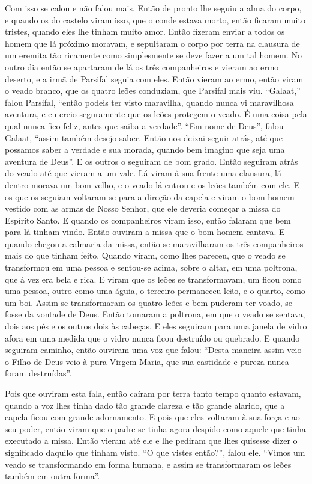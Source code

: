 Com isso se calou e não falou mais. Então de pronto lhe seguiu a alma do corpo,
e quando os do castelo viram isso, que o conde estava morto, então ficaram
muito tristes, quando eles lhe tinham muito amor. Então fizeram enviar a todos
os homem que lá próximo moravam, e sepultaram o corpo por terra na clausura de
um eremita tão ricamente como simplesmente se deve fazer a um tal homem. No
outro dia então se apartaram de lá os três companheiros e vieram ao ermo
deserto, e a irmã de Parsifal seguia com eles. Então vieram ao ermo, então
viram o veado branco, que os quatro leões conduziam, que Parsifal mais viu.
“Galaat,” falou Parsifal, “então podeis ter visto maravilha, quando nunca vi
maravilhosa aventura, e eu creio seguramente que os leões protegem o veado. É
uma coisa pela qual nunca fico feliz, antes que saiba a verdade”. “Em nome de
Deus”, falou Galaat, “assim também desejo saber. Então nos deixai seguir atrás,
até que possamos saber a verdade e sua morada, quando bem imagino que seja uma
aventura de Deus”. E os outros o seguiram de bom grado. Então seguiram atrás do
veado até que vieram a um vale. Lá viram à sua frente uma clausura, lá dentro
morava um bom velho, e o veado lá entrou e os leões também com ele. E os que os
seguiam voltaram-se para a direção da capela e viram o bom homem vestido com as
armas de Nosso Senhor, que ele deveria começar a missa do Espírito Santo. E
quando os companheiros viram isso, então falaram que bem para lá tinham vindo.
Então ouviram a missa que o bom homem cantava. E quando chegou a calmaria da
missa, então se maravilharam os três companheiros mais do que tinham feito.
Quando viram, como lhes pareceu, que o veado se transformou em uma pessoa e
sentou-se acima, sobre o altar, em uma poltrona, que à vez era bela e rica. E
viram que os leões se transformavam, um ficou como uma pessoa, outro como uma
águia, o terceiro permaneceu leão, e o quarto, como um boi. Assim se
transformaram os quatro leões e bem puderam ter voado, se fosse da vontade de
Deus. Então tomaram a poltrona, em que o veado se sentava, dois aos pés e os
outros dois às cabeças. E eles seguiram para uma janela de vidro afora em uma
medida que o vidro nunca ficou destruído ou quebrado. E quando seguiram
caminho, então ouviram uma voz que falou: “Desta maneira assim veio o Filho de
Deus veio à pura Virgem Maria, que sua castidade e pureza nunca foram
destruídas”.

Pois que ouviram esta fala, então caíram por terra tanto tempo quanto estavam,
quando a voz lhes tinha dado tão grande clareza e tão grande alarido, que a
capela ficou com grande adornamento. E pois que eles voltaram à sua força e ao
seu poder, então viram que o padre se tinha agora despido como aquele que tinha
executado a missa. Então vieram até ele e lhe pediram que lhes quisesse dizer o
significado daquilo que tinham visto. “O que vistes então?”, falou ele. “Vimos
um veado se transformando em forma humana, e assim se transformaram os leões
também em outra forma”. 

